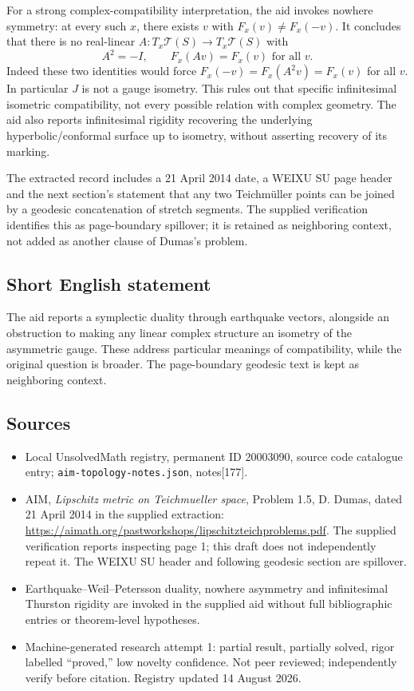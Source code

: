 \documentclass[11pt]{article}
\begin{document}
For a strong complex-compatibility interpretation, the aid invokes nowhere symmetry: at every such $x$, there exists $v$ with $F_x(v)\ne F_x(-v)$. It concludes that there is no real-linear $A:T_x\mathcal T(S)\to T_x\mathcal T(S)$ with
\[
 A^2=-I,\qquad F_x(Av)=F_x(v)\text{ for all }v.
\]
Indeed these two identities would force $F_x(-v)=F_x(A^2v)=F_x(v)$ for all $v$. In particular $J$ is not a gauge isometry. This rules out that specific infinitesimal isometric compatibility, not every possible relation with complex geometry. The aid also reports infinitesimal rigidity recovering the underlying hyperbolic/conformal surface up to isometry, without asserting recovery of its marking.

The extracted record includes a 21 April 2014 date, a WEIXU SU page header and the next section's statement that any two Teichm\"uller points can be joined by a geodesic concatenation of stretch segments. The supplied verification identifies this as page-boundary spillover; it is retained as neighboring context, not added as another clause of Dumas's problem.
\subsection{Short English statement}
The aid reports a symplectic duality through earthquake vectors, alongside an obstruction to making any linear complex structure an isometry of the asymmetric gauge. These address particular meanings of compatibility, while the original question is broader. The page-boundary geodesic text is kept as neighboring context.
\subsection{Sources}
\begin{itemize}
\item Local UnsolvedMath registry, permanent ID 20003090, source code catalogue entry; \texttt{aim-topology-notes.json}, notes[177].
\item AIM, \emph{Lipschitz metric on Teichmueller space}, Problem 1.5, D. Dumas, dated 21 April 2014 in the supplied extraction: \url{https://aimath.org/pastworkshops/lipschitzteichproblems.pdf}. The supplied verification reports inspecting page 1; this draft does not independently repeat it. The WEIXU SU header and following geodesic section are spillover.
\item Earthquake--Weil--Petersson duality, nowhere asymmetry and infinitesimal Thurston rigidity are invoked in the supplied aid without full bibliographic entries or theorem-level hypotheses.
\item Machine-generated research attempt 1: partial result, partially solved, rigor labelled ``proved,'' low novelty confidence. Not peer reviewed; independently verify before citation. Registry updated 14 August 2026.
\end{itemize}
\end{document}
